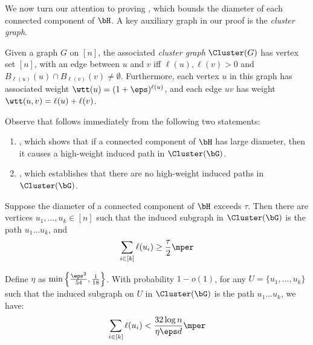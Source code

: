 \documentclass[11pt,letterpaper]{article}
\begin{document}
    We now turn our attention to proving , which bounds the diameter of each connected component of $\bH$.
    A key auxiliary graph in our proof is the \emph{cluster graph}.
    \begin{definition}\label{def:cluster-graph}
        Given a graph $G$ on $[n]$, the associated \emph{cluster graph} $\Cluster(G)$ has vertex set $[n]$, with an edge between $u$ and $v$ iff $\ell(u),\ell(v) > 0$ and $B_{\ell(u)}(u) \cap B_{\ell(v)}(v) \ne \emptyset$. 
        Furthermore, each vertex $u$ in this graph has associated weight $\wtt(u) = (1+\eps)^{\ell(u)}$, and each edge $uv$ has weight $\wtt(u, v) = \ell(u)+\ell(v)$.
    \end{definition}
    Observe that  follows immediately from the following two statements:
    \begin{enumerate}
        \item {}, which shows that if a connected component of $\bH$ has large diameter, then it causes a high-weight induced path in $\Cluster(\bG)$.
        \item {}, which establishes that there are no high-weight induced paths in $\Cluster(\bG)$.
    \end{enumerate}
    \begin{lemma}
    \label{lem:no-tree-excess-cluster-graph}
        Suppose the diameter of a connected component of $\bH$ exceeds $\tau$.
        Then there are vertices $u_1,\dots, u_k\in[n]$ such that the induced subgraph in $\Cluster(\bG)$ is the path $u_1\dots u_k$, and
        \[
            \sum_{i\in[k]} \ell(u_i) \ge \frac{\tau}{2}\mper
        \]
    \end{lemma}
    \begin{lemma}   \label{lem:no-long-path-cluster}
        Define $\eta$ as $\min\left\{\frac{\eps^2}{54}, \frac{1}{18}\right\}$.
        With probability $1-o(1)$, for any $U = \{u_1,\dots,u_k\}$ such that the induced subgraph on $U$ in $\Cluster(\bG)$ is the path $u_1\dots u_k$, we have:
        \[
            \sum_{i\in[k]} \ell(u_i) < \frac{32\log n}{\eta\eps d}\mper
        \]
    \end{lemma}
\end{document}
